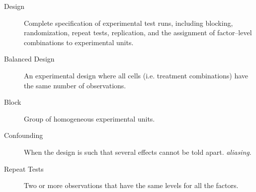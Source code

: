 \begin{description}
\item [Design]  Complete specification of experimental test runs, including blocking, randomization, repeat tests, replication, and the assignment of factor–level combinations to experimental units.

\item [Balanced Design] An experimental design where all cells (i.e. treatment combinations) have the same number of observations.

\item [Block] Group of homogeneous experimental units.

\item [Confounding] When the design is such that several effects cannot be told apart. \Aka \emph{aliasing}.

\item [Repeat Tests] Two or more observations that have the same levels for all the
factors.


\end{description}

















